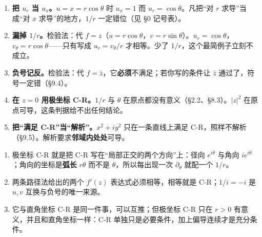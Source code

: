 \documentclass[11pt]{ctexart}
\begin{document}

\begin{enumerate}[label=(\arabic*),leftmargin=2.0em]
\item \textbf{把 $u_r$ 当 $u_x$。}$u=x=r\cos\theta$ 时 $u_x=1$ 而 $u_r=\cos\theta$。凡把“对 $r$ 求导”当成“对 $x$ 求导”的地方，$1/r$ 一定错位（见 §0 记号表）。
\item \textbf{漏掉 $1/r$。}检验法：代 $f=z$（$u=r\cos\theta$，$v=r\sin\theta$）。$u_r=\cos\theta$，$v_\theta=r\cos\theta$——只有写成 $u_r=v_\theta/r$ 才相等。少了 $1/r$，这个最简例子立刻不成立。
\item \textbf{负号记反。}检验法：代 $f=\bar z$，它\textbf{必须}不满足；若你写的条件让 $\bar z$ 通过了，符号一定错（§9.4）。
\item \textbf{在 $z=0$ 用极坐标 C-R。}$1/r$ 与 $\theta$ 在原点都没有意义（§2.2、§8.3）。$|z|^2$ 在原点可导，这条判据给不出任何结论。
\item \textbf{把“满足 C-R”当“解析”。}$x^2+iy^2$ 只在一条直线上满足 C-R，照样不解析（§9.5）。解析要求\textbf{邻域内处处}可导。
\end{enumerate}


\begin{enumerate}[label=(\arabic*),leftmargin=2.0em]
\item 极坐标 C-R 就是把 C-R 写在“局部正交的两个方向”上：径向 $e^{i\theta}$ 与角向 $ie^{i\theta}$；角向的坐标是\textbf{弧长} $r\theta$ 而不是 $\theta$，所以每出现一次 $\partial_\theta$ 就配一个 $1/r$。
\item 两条路径法给出的两个 $f'(z)$ 表达式必须相等，相等就是 C-R；$1/i=-i$ 是 $u,v$ 互换与负号的唯一来源。
\item 它与直角坐标 C-R 是同一件事，可以互推；但极坐标 C-R 只在 $r>0$ 有意义，并且和直角坐标一样：C-R 单独只是必要条件，加上偏导连续才是充分条件。
\end{enumerate}

\end{document}
